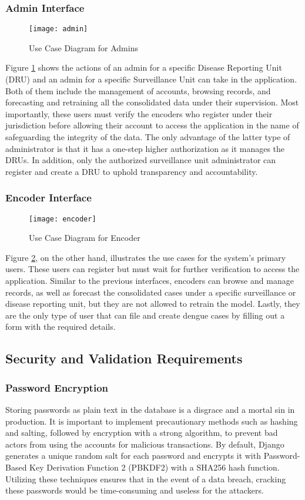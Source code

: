 \subsubsection{Admin Interface}
\begin{figure}[H]
	\centering
	\texttt{[image: admin]}
	\caption{Use Case Diagram for Admins}
	\label{fig:admin-use-case}
\end{figure}
Figure \ref{fig:admin-use-case} shows the actions of an admin for a specific Disease Reporting Unit (DRU) and an admin for a specific Surveillance Unit can take in the application. Both of them include the management of accounts, browsing records, and forecasting and retraining all the consolidated data under their supervision. Most importantly, these users must verify the encoders who register under their jurisdiction before allowing their account to access the application in the name of safeguarding the integrity of the data. The only advantage of the latter type of administrator is that it has a one-step higher authorization as it manages the DRUs. In addition, only the authorized surveillance unit administrator can register and create a DRU to uphold transparency and accountability.  


\subsubsection{Encoder Interface}
\begin{figure}[H]
	\centering
	\texttt{[image: encoder]}
	\caption{Use Case Diagram for Encoder}
	\label{fig:encoder-use-case}
\end{figure}

Figure \ref{fig:encoder-use-case}, on the other hand, illustrates the use cases for the system's primary users. These users can register but must wait for further verification to access the application. Similar to the previous interfaces, encoders can browse and manage records, as well as forecast the consolidated cases under a specific surveillance or disease reporting unit, but they are not allowed to retrain the model. Lastly, they are the only type of user that can file and create dengue cases by filling out a form with the required details.


\subsection{Security and Validation Requirements}
\subsubsection{Password Encryption}
Storing passwords as plain text in the database is a disgrace and a mortal sin in production. It is important to implement precautionary methods such as hashing and salting, followed by encryption with a strong algorithm, to prevent bad actors from using the accounts for malicious transactions. By default, Django generates a unique random salt for each password and encrypts it with Password-Based Key Derivation Function 2 (PBKDF2) with a SHA256 hash function. Utilizing these techniques ensures that in the event of a data breach, cracking these passwords would be time-consuming and useless for the attackers. 

